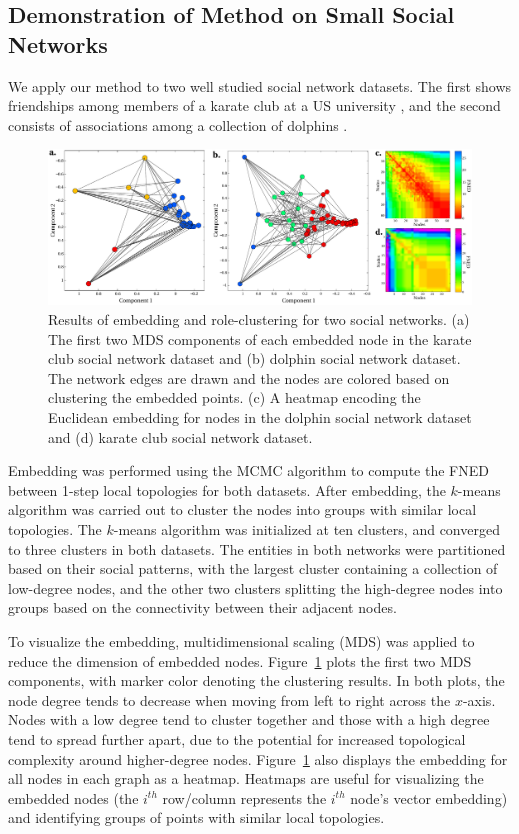 \documentclass{article}
\begin{document}
\subsection{Demonstration of Method on Small Social Networks}
We apply our method to two well studied social network datasets. The first shows friendships among members of a karate club at a US university \cite{zachary1977information}, and the second consists of associations among a collection of dolphins \cite{bottleNoseDolphinPeople}.
\begin{figure}[h!tbp]
  \centering               
  \includegraphics[width=1\textwidth]{fig/fig3.pdf}
  \caption{Results of embedding and role-clustering for two social networks. (a) The first two MDS components of each embedded node in the karate club social network dataset and (b) dolphin social network dataset. The network edges are drawn and the nodes are colored based on clustering the embedded points. (c) A heatmap encoding the Euclidean embedding for nodes in the dolphin social network dataset and (d) karate club social network dataset.}
  \label{fig:smallSocialNetwork}
\end{figure}

Embedding was performed using the MCMC algorithm to compute the FNED between 1-step local topologies for both datasets. After embedding, the $k$-means algorithm was carried out to cluster the nodes into groups with similar local topologies. The $k$-means algorithm was initialized at ten clusters, and converged to three clusters in both datasets. The entities in both networks were partitioned based on their social patterns, with the largest cluster containing a collection of low-degree nodes, and the other two clusters splitting the high-degree nodes into groups based on the connectivity between their adjacent nodes.

To visualize the embedding, multidimensional scaling (MDS) was applied to reduce the dimension of embedded nodes. Figure~\ref{fig:smallSocialNetwork} plots the first two MDS components, with marker color denoting the clustering results. In both plots, the node degree tends to decrease when moving from left to right across the $x$-axis. Nodes with a low degree tend to cluster together and those with a high degree tend to spread further apart, due to the potential for increased topological complexity around higher-degree nodes. Figure~\ref{fig:smallSocialNetwork} also displays the embedding for all nodes in each graph as a heatmap. Heatmaps are useful for visualizing the embedded nodes (the $i^{th}$ row/column represents the $i^{th}$ node's vector embedding) and identifying groups of points with similar local topologies.
\end{document}
